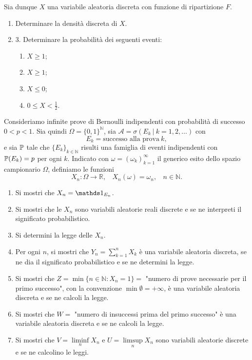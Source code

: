 Sia dunque $X$ una variabile aleatoria discreta con funzione di ripartizione $F$.
\begin{enumerate}
\item Determinare la densità discreta di $X$.
\item 3. Determinare la probabilità dei seguenti eventi:
\begin{enumerate}
\item $X\geq 1$;
\item $X\geq 1$;
\item $X\leq 0$;
\item $0\leq X< \frac{1}{2}$.
\end{enumerate}
\end{enumerate}

Consideriamo infinite prove di Bernoulli indipendenti con probabilità di successo $0< p< 1$. Sia quindi $\Omega =\{0,1\}^{\mathbb{N}}$, sia $\mathcal{A} =\sigma ( E_{k} \ |\ k=1,2,\dots )$ con
\begin{equation*}
E_{k} =\text{successo alla prova} \ k,
\end{equation*}
e sia $\mathbb{P}$ tale che $\{E_{k}\}_{k\in \mathbb{N}}$ risulti una famiglia di eventi indipendenti con $\mathbb{P}( E_{k}) =p$ per ogni $k$. Indicato con $\omega =( \omega _{k})_{k=1}^{\infty }$ il generico esito dello spazio campionario $\Omega $, definiamo le funzioni
\begin{equation*}
X_{n} :\Omega \rightarrow \mathbb{R} ,\ \ \ \ X_{n}( \omega ) =\omega _{n} ,\ \ \ \ n\in \mathbb{N} .
\end{equation*}
\begin{enumerate}
\item Si mostri che $X_{n} =\Ind_{E_{n}}$.
\item Si mostri che le $X_{n}$ sono variabili aleatorie reali discrete e se ne interpreti il significato probabilistico.
\item Si determini la legge delle $X_{n}$.
\item Per ogni $n$, si mostri che $Y_{n} =\sum _{k=1}^{n} X_{k}$ è una variabile aleatoria discreta, se ne dia il significato probabilistico e se ne determini la legge.
\item Si mostri che $Z=\min\{n\in \mathbb{N} :X_{n} =1\} =$ "numero di prove necessarie per il primo successo", con la convenzione $\min \emptyset =+\infty $, è una variabile aleatoria discreta e se ne calcoli la legge.
\item Si mostri che $W=$ "numero di insuccessi prima del primo successo" è una variabile aleatoria discreta e se ne calcoli la legge.
\item Si mostri che $V=\liminf\limits _{n} X_{n}$ e $U=\limsup\limits _{n} X_{n}$ sono variabili aleatorie discrete e se ne calcolino le leggi.
\end{enumerate}

